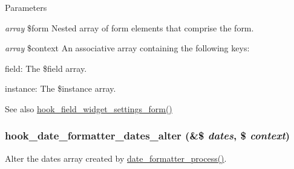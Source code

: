 \begin{DoxyParams}{Parameters}
\item[{\em array}]\$form Nested array of form elements that comprise the form. \item[{\em array}]\$context An associative array containing the following keys:
\begin{DoxyItemize}
\item field: The \$field array.
\item instance: The \$instance array.
\end{DoxyItemize}\end{DoxyParams}
\begin{DoxySeeAlso}{See also}
\hyperlink{group__field__types_gabe5ece2134d0cbdfc3c4793f24c5866c}{hook\_\-field\_\-widget\_\-settings\_\-form()} 
\end{DoxySeeAlso}
\hypertarget{date_8api_8php_aae52e9a3c4d3926f92ace9b0ec0041f4}{
\subsubsection[{hook\_\-date\_\-formatter\_\-dates\_\-alter}]{\setlength{\rightskip}{0pt plus 5cm}hook\_\-date\_\-formatter\_\-dates\_\-alter (\&\$ {\em dates}, \/  \$ {\em context})}}
\label{date_8api_8php_aae52e9a3c4d3926f92ace9b0ec0041f4}
Alter the dates array created by \hyperlink{date_8module_a4b019297d5d8f388aa2252ad62b3bfde}{date\_\-formatter\_\-process()}.


